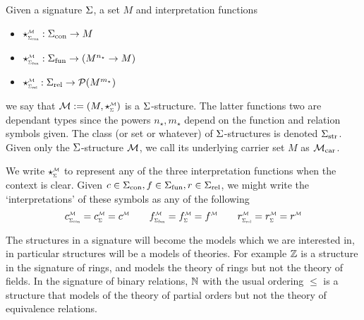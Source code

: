\begin{dfn}
    Given a signature $\Sigma$, a set $M$ and interpretation functions 
    \begin{itemize}
        \item $\intp{\const{\Si}}{\MM} : \const{\Si} \to M$
        \item $\intp{\func{\Si}}{\MM} : \func{\Si} \to (M^{n_\star} \to M)$
        \item $\intp{\rel{\Si}}{\MM} : \rel{\Si} \to \PP(M^{m_{\star}})$
    \end{itemize}
    we say that $\MM := (M, \intp{\Si}{\MM})$ is a $\Sigma$-structure. 
    The latter functions two are dependant types since the powers
    $n_\star, m_\star$ 
    depend on the function and relation symbols given.
    The class (or set or whatever) of $\Sigma$-structures is denoted ${\Sigma}_\mathrm{str}$.
    Given only the $\Sigma$-structure $\mathcal{M}$, 
    we call its underlying carrier set $M$ as ${\mathcal{M}}_\mathrm{car}$.

    We write $\intp{\Si}{\MM}$ to represent any of the three interpretation 
    functions when the context is clear.
    Given $c \in {\Sigma}_\mathrm{con}, f \in {\Sigma}_\mathrm{fun}, r \in {\Sigma}_\mathrm{rel}$, 
    we might write the `interpretations' 
    of these symbols as any of the following
    \[
        \subintp{\const{\Si}}{\MM}{c} = \subintp{\Si}{\MM}{c} = \modintp{\MM}{c}
        \quad \quad 
        \subintp{\func{\Si}}{\MM}{f} = \subintp{\Si}{\MM}{f}  = \modintp{\MM}{f}
        \quad \quad
        \subintp{\rel{\Si}}{\MM}{r} = \subintp{\Si}{\MM}{r}  = \modintp{\MM}{r}
    \]
\end{dfn}
The structures in a signature will become the models which we are interested in,
in particular structures will be a models of theories.
For example $\mathbb{Z}$ is a structure in the signature of rings, 
and models the theory of rings but not the theory of fields.
In the signature of binary relations, 
$\mathbb{N}$ with the usual ordering $\leq$ is a structure that models of 
the theory of partial orders but not the theory of equivalence relations.

